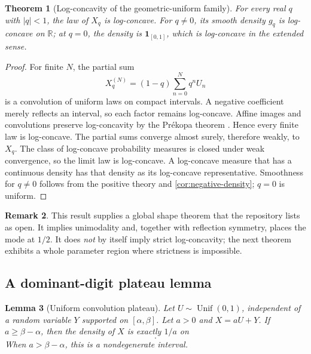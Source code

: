 \documentclass[11pt]{article}
\newtheorem{theorem}{Theorem}[section]
\newtheorem{lemma}[theorem]{Lemma}
\theoremstyle{definition}
\newtheorem{remark}[theorem]{Remark}
\newcommand{\R}{\mathbb R}
\begin{document}
\begin{theorem}[Log-concavity of the geometric-uniform family]\label{thm:logconcavity}
For every real \(q\) with \(\lvert q\rvert<1\), the law of \(X_q\) is log-concave.  For
\(q\ne0\), its smooth density \(g_q\) is log-concave on \(\R\); at \(q=0\), the density
is \(\mathbf 1_{[0,1]}\), which is log-concave in the extended sense.
\end{theorem}

\begin{proof}
For finite \(N\), the partial sum
\[
 X_q^{(N)}=(1-q)\sum_{n=0}^{N}q^nU_n
\]
is a convolution of uniform laws on compact intervals.  A negative coefficient merely
reflects an interval, so each factor remains log-concave.  Affine images and convolutions
preserve log-concavity by the Pr\'ekopa theorem \cite{prekopa1973}.  Hence every finite
law is log-concave.  The partial sums converge almost surely, therefore weakly, to \(X_q\).
The class of log-concave probability measures is closed under weak convergence, so the
limit law is log-concave.  A log-concave measure that has a continuous density has that
density as its log-concave representative.  Smoothness for \(q\ne0\) follows from the
positive theory and \cref{cor:negative-density}; \(q=0\) is uniform.
\end{proof}

\begin{remark}
This result supplies a global shape theorem that the repository lists as open.  It implies
unimodality and, together with reflection symmetry, places the mode at \(1/2\).  It does
\emph{not} by itself imply strict log-concavity; the next theorem exhibits a whole
parameter region where strictness is impossible.
\end{remark}

\subsection{A dominant-digit plateau lemma}

\begin{lemma}[Uniform convolution plateau]\label{lem:uniform-plateau}
Let \(U\sim\operatorname{Unif}(0,1)\), independent of a random variable \(Y\) supported
on \([\alpha,\beta]\).  Let \(a>0\) and \(X=aU+Y\).  If \(a\ge\beta-\alpha\), then the
density of \(X\) is exactly \(1/a\) on
\begin{equation}
 [\beta,\alpha+a].                                        \label{eq:general-plateau}
\end{equation}
When \(a>\beta-\alpha\), this is a nondegenerate interval.
\end{lemma}
\end{document}
